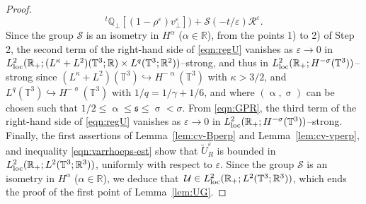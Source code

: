 \documentclass[11pt,reqno]{amsart}
\def \R{{\mathbb{R}}}
\def \Q{{\mathbb{Q}}}
\def \T{{\mathbb{T}}}
\begin{document}
\begin{proof}
\begin{equation}
    {}^t\Q_\perp[(1-\rho^\varepsilon) v_\perp^\varepsilon]\big) + \mathcal S(-t/\varepsilon) \mathcal R^\varepsilon.
\end{equation}
Since  the group $\mathcal S$ is an isometry in $H^{\alpha}$ ($\alpha\in \R$), from the points 1) to 2) of Step 2, the second term of the right-hand side of \eqref{eqn:regU} vanishes as $\varepsilon \rightarrow 0$ in $L_{\rm loc}^{2}(\R_+; (L^\kappa + L^2)(\T^3;\R)\times L^q(\T^3;\R^2))$--strong, and thus in $L_{\rm loc}^{2}(\R_+; H^{-\sigma}(\T^3))$--strong since $ (L^\kappa + L^2)(\T^3) \hookrightarrow H^{-\upalpha}(\T^3)$ with $\kappa >3/2$, and $L^q(\T^3) \hookrightarrow H^{-\upsigma}(\T^3)$ with $1/q=1/\gamma+1/6$, and where $(\upalpha, \upsigma)$ can be chosen such that $1/2 \leq \upalpha \leq \mathfrak s \leq \upsigma < \sigma $. From \eqref{eqn:GPR}, the third term of the right-hand side of \eqref{eqn:regU} vanishes as $\varepsilon \rightarrow 0$ in  $ L_{\rm loc}^{2}(\R_+; H^{-\sigma}(\T^3))$--strong.\\
Finally, the first assertions of Lemma~\ref{lem:cv-Bperp} and  Lemma~\ref{lem:cv-vperp}, and inequality \eqref{eqn:varrhoeps-est} show that $ \widetilde U_R^\varepsilon$ is bounded in $L_{\rm loc}^{2}(\R_+;  L^2(\T^3;\R^3))$, uniformly with respect to $\varepsilon$. Since  the group $\mathcal S$ is an isometry in $H^{\alpha}$ ($\alpha\in \R$), we deduce that $\, \mathcal U \in  L_{\rm loc}^{2}(\R_+;  L^2(\T^3;\R^3))$, which ends the proof of the first point of Lemma~\ref{lem:UG}.


\end{proof}
\end{document}
